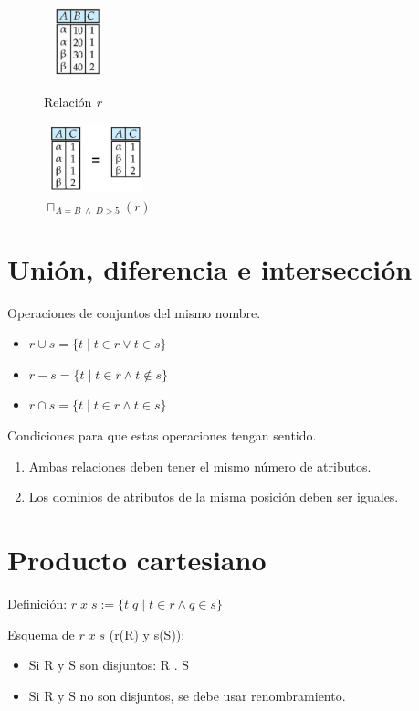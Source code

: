 \documentclass[12pt,a4paper]{report}
\begin{document}
		\begin{figure}[htb]
				\centering
				\includegraphics[width=2cm, height=2cm]{./imagenes/proyeccion1.png}
				\caption{Relación \textit{r}}
				\vspace{5mm}
				\includegraphics[width=3cm, height=2cm]{./imagenes/proyeccion2.png}
				\caption{$\sqcap_{A=B \; \land \; D > 5}(r)$}
		\end{figure}
	
	\section{Unión, diferencia e intersección}
		\par Operaciones de conjuntos del mismo nombre.
		\begin{itemize}
			\item $r \cup s = \lbrace t \; | \; t \in r \lor t \in s \rbrace$
			\item $r - s = \lbrace t \; | \; t \in r \land t \notin s \rbrace$
			\item $r \cap s = \lbrace t \; | \; t \in r \land t \in s \rbrace$
		\end{itemize}
		\par Condiciones para que estas operaciones tengan sentido.
		\begin{enumerate}
			\item Ambas relaciones deben tener el mismo número de atributos.
			\item Los dominios de atributos de la misma posición deben ser iguales.
		\end{enumerate}

	\section{Producto cartesiano}
		\par \underline{Definición:} $r \; x \; s := \lbrace t \; q \; | \; t \in r \land q \in s \rbrace$
		\vspace{5mm}
		\par Esquema de $r \; x \; s$ (r(R) y s(S)):
		\begin{itemize}
			\item Si R y S son disjuntos: R . S
			\item Si R y S no son disjuntos, se debe usar renombramiento.
		\end{itemize}
\end{document}
